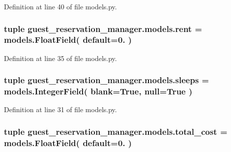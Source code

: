 Definition at line 40 of file models.\-py.

\hypertarget{namespaceguest__reservation__manager_1_1models_a06ce0b97c0b006fb2b9a1508b8f07627}{
\subsubsection[{rent}]{\setlength{\rightskip}{0pt plus 5cm}tuple guest\-\_\-reservation\-\_\-manager.\-models.\-rent = models.\-Float\-Field( default=0. )}}\label{namespaceguest__reservation__manager_1_1models_a06ce0b97c0b006fb2b9a1508b8f07627}


Definition at line 35 of file models.\-py.

\hypertarget{namespaceguest__reservation__manager_1_1models_a8c56ef9f51045d16c6b165422c1fdc1d}{
\subsubsection[{sleeps}]{\setlength{\rightskip}{0pt plus 5cm}tuple guest\-\_\-reservation\-\_\-manager.\-models.\-sleeps = models.\-Integer\-Field( blank=True, null=True )}}\label{namespaceguest__reservation__manager_1_1models_a8c56ef9f51045d16c6b165422c1fdc1d}


Definition at line 31 of file models.\-py.

\hypertarget{namespaceguest__reservation__manager_1_1models_a6b33a5bec1060ff8750ffde85f75f2cf}{
\subsubsection[{total\-\_\-cost}]{\setlength{\rightskip}{0pt plus 5cm}tuple guest\-\_\-reservation\-\_\-manager.\-models.\-total\-\_\-cost = models.\-Float\-Field( default=0. )}}\label{namespaceguest__reservation__manager_1_1models_a6b33a5bec1060ff8750ffde85f75f2cf}


